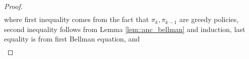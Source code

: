\documentclass{article} %
\newcommand{\cP}{\mathcal{P}}
\newcommand*{\para}[1]{\left({#1}\right)}
\begin{document}
\begin{proof}
\begin{align*}
\end{align*}   
where first inequality comes from the fact that $\pi_{k}, \pi_{k-1}$ are greedy policies, second inequality follows from Lemma \ref{lem::anc_bellman} and induction, last equality is from first Bellman equation, and 
\begin{align*}

\end{align*}
\end{proof}
\end{document}
